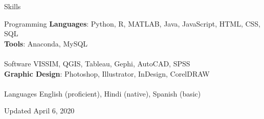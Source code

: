 \documentclass{resume} %
\begin{document}
\begin{rSection}{Skills}
    \begin{tabbing}
    Programming \hspace*{0.5cm} \= \textbf{Languages}: Python, R, MATLAB, Java, JavaScript, HTML, CSS, SQL
    \\ \> \textbf{Tools}: Anaconda, MySQL \\
    \\ Software
       \> VISSIM, QGIS, Tableau, Gephi, AutoCAD, SPSS
    \\ \> \textbf{Graphic Design}: Photoshop, Illustrator, InDesign, CorelDRAW \\
    \\ Languages \> English (proficient), Hindi (native), Spanish (basic)
    \end{tabbing}
\end{rSection}

\vspace*{\fill}
\centering Updated April 6, 2020
\end{document}
